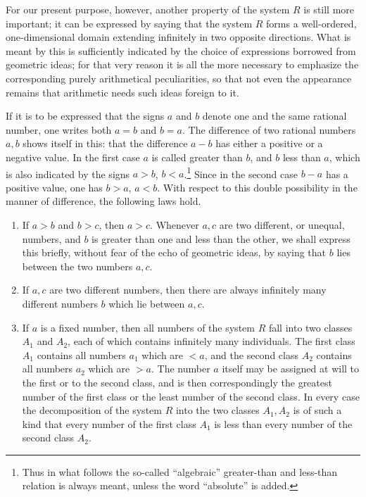\documentclass[11pt]{article}
\begin{document}
For our present purpose, however, another property of the system $R$ is still more important; it can be expressed by saying that the system $R$ forms a well-ordered, one-dimensional domain extending infinitely in two opposite directions. What is meant by this is sufficiently indicated by the choice of expressions borrowed from geometric ideas; for that very reason it is all the more necessary to emphasize the corresponding purely arithmetical peculiarities, so that not even the appearance remains that arithmetic needs such ideas foreign to it.

If it is to be expressed that the signs $a$ and $b$ denote one and the same rational number, one writes both $a=b$ and $b=a$. The difference of two rational numbers $a,b$ shows itself in this: that the difference $a-b$ has either a positive or a negative value. In the first case $a$ is called greater than $b$, and $b$ less than $a$, which is also indicated by the signs $a>b$, $b<a$.\footnote{Thus in what follows the so-called ``algebraic'' greater-than and less-than relation is always meant, unless the word ``absolute'' is added.} Since in the second case $b-a$ has a positive value, one has $b>a$, $a<b$. With respect to this double possibility in the manner of difference, the following laws hold.

\begin{enumerate}[label=\Roman*.]
\item If $a>b$ and $b>c$, then $a>c$. Whenever $a,c$ are two different, or unequal, numbers, and $b$ is greater than one and less than the other, we shall express this briefly, without fear of the echo of geometric ideas, by saying that $b$ lies between the two numbers $a,c$.
\item If $a,c$ are two different numbers, then there are always infinitely many different numbers $b$ which lie between $a,c$.
\item If $a$ is a fixed number, then all numbers of the system $R$ fall into two classes $A_1$ and $A_2$, each of which contains infinitely many individuals. The first class $A_1$ contains all numbers $a_1$ which are $<a$, and the second class $A_2$ contains all numbers $a_2$ which are $>a$. The number $a$ itself may be assigned at will to the first or to the second class, and is then correspondingly the greatest number of the first class or the least number of the second class. In every case the decomposition of the system $R$ into the two classes $A_1,A_2$ is of such a kind that every number of the first class $A_1$ is less than every number of the second class $A_2$.
\end{enumerate}
\end{document}
